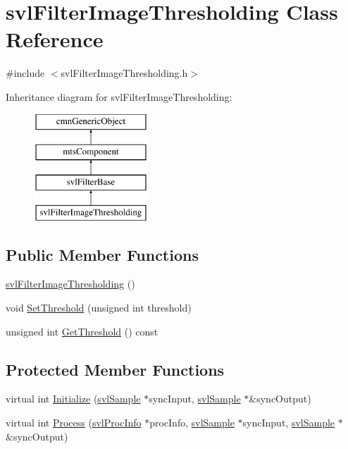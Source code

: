 \hypertarget{classsvl_filter_image_thresholding}{\section{svl\-Filter\-Image\-Thresholding Class Reference}
\label{classsvl_filter_image_thresholding}
}


{\ttfamily \#include $<$svl\-Filter\-Image\-Thresholding.\-h$>$}

Inheritance diagram for svl\-Filter\-Image\-Thresholding\-:\begin{figure}[H]
\begin{center}
\leavevmode
\includegraphics[height=4.000000cm]{df/d21/classsvl_filter_image_thresholding}
\end{center}
\end{figure}
\subsection*{Public Member Functions}
\begin{DoxyCompactItemize}
\item 
\hyperlink{classsvl_filter_image_thresholding_a70b0376263985d4291c1f8b77da0b3f6}{svl\-Filter\-Image\-Thresholding} ()
\item 
void \hyperlink{classsvl_filter_image_thresholding_a562edec14a461bbeb29fffff65dff308}{Set\-Threshold} (unsigned int threshold)
\item 
unsigned int \hyperlink{classsvl_filter_image_thresholding_a6141caa0d4a23ae2039cfefbdddab07e}{Get\-Threshold} () const 
\end{DoxyCompactItemize}
\subsection*{Protected Member Functions}
\begin{DoxyCompactItemize}
\item 
virtual int \hyperlink{classsvl_filter_image_thresholding_ab90b5a7925b48010f4cf2576ca276bca}{Initialize} (\hyperlink{classsvl_sample}{svl\-Sample} $\ast$sync\-Input, \hyperlink{classsvl_sample}{svl\-Sample} $\ast$\&sync\-Output)
\item 
virtual int \hyperlink{classsvl_filter_image_thresholding_a3e21d87913f686dd80aac167fe084fc6}{Process} (\hyperlink{structsvl_proc_info}{svl\-Proc\-Info} $\ast$proc\-Info, \hyperlink{classsvl_sample}{svl\-Sample} $\ast$sync\-Input, \hyperlink{classsvl_sample}{svl\-Sample} $\ast$\&sync\-Output)
\end{DoxyCompactItemize}
